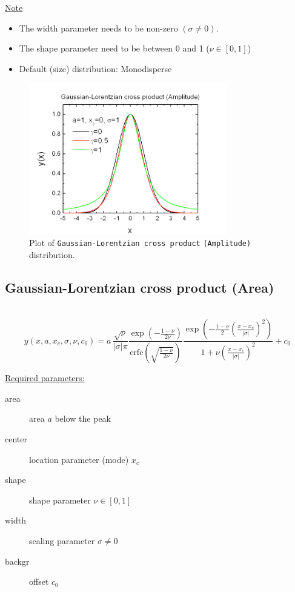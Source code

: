 \uline{Note}
\begin{itemize}
  \item The width parameter needs to be non-zero $(\sigma\neq 0)$.
  \item The shape parameter need to be between 0 and 1 ($\nu\in [0,1]$)
  \item Default (size) distribution: Monodisperse
\end{itemize}
\begin{figure}[htb]
\begin{center}
\includegraphics[width=0.768\textwidth]{GaussianLorentzianCrossProductAmplitude.png}
\end{center}
\caption{Plot of \texttt{Gaussian-Lorentzian cross product} \texttt{(Amplitude)} distribution.}
\label{fig:GaussianLorentzianCrossProductAmplitude}
\end{figure}

\clearpage

\subsection{Gaussian-Lorentzian cross product (Area)} ~\\
\label{sec:GaussianLorentzianCrossProductArea}
\begin{equation}
y(x,a,x_c,\sigma,\nu,c_0) = a\,
\frac{\sqrt{\nu}}{|\sigma|\pi}\frac{\exp\left(-\frac{1-\nu}{2\nu}\right)}{\mbox{erfc}\left(\sqrt{\frac{1-\nu}{2\nu}}\right)}
\frac{\exp\left(-\frac{1-\nu}{2}\left(\frac{x-x_c}{|\sigma|}\right)^2\right)}{1+\nu\left(\frac{x-x_c}{|\sigma|}\right)^2}
+c_0
\end{equation}

\vspace{5mm}

\uline{Required parameters:}
\begin{description}
    \item[area] area $a$ below the peak
    \item[center] location parameter (mode) $x_c$
    \item[shape] shape parameter $\nu\in [0,1]$
    \item[width] scaling parameter $\sigma \neq 0$
    \item[backgr] offset $c_0$
\end{description}

